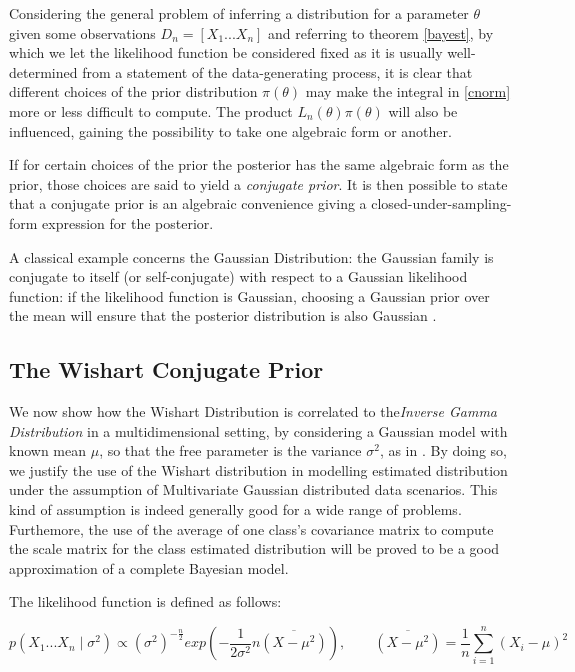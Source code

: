 \documentclass[12pt,openright,twoside,a4paper]{book}
\begin{document}
Considering the general problem of inferring a distribution for a parameter $\theta$ given some observations $D_n=[X_1...X_n]$ and referring to theorem \ref{bayest}, by which we let the likelihood function be considered fixed as it is usually well-determined from a statement of the data-generating process,  it is clear that different choices of the prior distribution $\pi(\theta)$ may make the integral in \ref{cnorm} more or less difficult to compute.
The product $L_n(\theta)\pi(\theta)$ will also be influenced, gaining the possibility to take one algebraic form or another.

If for certain choices of the prior the posterior has the same algebraic form as the prior, those choices are said to yield a \textit{conjugate prior}.
It is then possible to state that a conjugate prior is an algebraic convenience giving a closed-under-sampling-form expression for the posterior.

A classical example concerns the Gaussian Distribution: the Gaussian family is conjugate to itself (or self-conjugate) with respect to a Gaussian likelihood function: if the likelihood function is Gaussian, choosing a Gaussian prior over the mean will ensure that the posterior distribution is also Gaussian \cite{CBA}.

\subsection{The Wishart Conjugate Prior}

We now show how the Wishart Distribution is correlated to the\textit{Inverse Gamma Distribution} in a multidimensional setting, by  considering a Gaussian model with known mean $\mu$, so that the free parameter is the variance  $\sigma^2$, as in \cite{SML}.
By doing so, we justify the use of the Wishart distribution in modelling estimated distribution under the assumption of Multivariate Gaussian distributed data scenarios.
This kind of assumption is indeed generally good for a wide range of problems.
Furthemore, the use of the average of one class's covariance matrix to compute the scale matrix for the class estimated distribution will be proved to be a good approximation of a complete Bayesian model.

The likelihood function is defined as follows:

\begin{equation}
p(X_1...X_n\mid \sigma^2)\propto (\sigma^2)^{-\frac{n}{2}}exp(-\frac{1}{2\sigma^2}n \overline{(X-\mu^2)}) , \qquad \overline{(X-\mu^2)}=\frac{1}{n}\sum_{i=1}^n(X_i-\mu)^2
\label{gausslike}
\end{equation}
\\[12pt]
\end{document}
